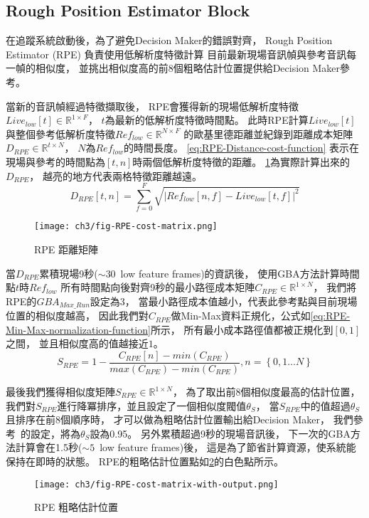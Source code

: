 \documentclass[class=NCU_thesis, crop=false]{standalone}
\begin{document}
\subsection{Rough Position Estimator Block} \label{ch3-subst-RPE}
在追蹤系統啟動後，為了避免Decision Maker的錯誤對齊，
Rough Position Estimator (RPE) 負責使用低解析度特徵計算
目前最新現場音訊幀與參考音訊每一幀的相似度，
並挑出相似度高的前8個粗略估計位置提供給Decision Maker參考。

當新的音訊幀經過特徵擷取後，
RPE會獲得新的現場低解析度特徵$Live_{low}[t] \in \mathbb{R}^{1 \times F}$，
$t$為最新的低解析度特徵時間點。
此時RPE計算$Live_{low}[t]$與整個參考低解析度特徵$Ref_{low} \in \mathbb{R}^{N \times F}$
的歐基里德距離並紀錄到距離成本矩陣$D_{RPE} \in \mathbb{R}^{t \times N}$，
$N$為$Ref_{low}$的時間長度。
\cref{eq:RPE-Distance-cost-function}
表示在現場與參考的時間點為$[t, n]$時兩個低解析度特徵的距離。
\cref{fig:fig-ch3-RPE-cost-matrix}為實際計算出來的$D_{RPE}$，
越亮的地方代表兩格特徵距離越遠。
\begin{equation}
    \label{eq:RPE-Distance-cost-function}
    D_{RPE}[t, n] = \sum_{f = 0}^{F}\sqrt{
    \left\lvert Ref_{low}[n, f]-Live_{low}[t, f]\right\rvert^{2}} 
\end{equation}

\begin{figure}[H]
    \centering
    \texttt{[image: ch3/fig-RPE-cost-matrix.png]}
    \caption{RPE 距離矩陣}
    \label{fig:fig-ch3-RPE-cost-matrix}
\end{figure}

當$D_{RPE}$累積現場9秒($\sim 30$\ low feature frames)的資訊後，
使用GBA方法計算時間點$t$時$Ref_{low}$
所有時間點向後對齊9秒的最小路徑成本矩陣$C_{RPE} \in \mathbb{R}^{1 \times N}$，
我們將RPE的$GBA_{Max\_Run}$設定為3，
當最小路徑成本值越小，代表此參考點與目前現場位置的相似度越高，
因此我們對$C_{RPE}$做Min-Max資料正規化，公式如\cref{eq:RPE-Min-Max-normalization-function}所示，
所有最小成本路徑值都被正規化到$[0,1]$之間，
並且相似度高的值越接近$1$。
\begin{equation}
    \label{eq:RPE-Min-Max-normalization-function}
    S_{RPE} = 1-\frac{C_{RPE}[n]-min(C_{RPE})}{max(C_{RPE})-min(C_{RPE})},
    n = \left\{0, 1 \ldots N\right\} 
\end{equation}

最後我們獲得相似度矩陣$S_{RPE} \in \mathbb{R}^{1 \times N}$，
為了取出前8個相似度最高的估計位置，
我們對$S_{RPE}$進行降冪排序，並且設定了一個相似度閥值$\theta _{S}$，
當$S_{RPE}$中的值超過$\theta _{S}$且排序在前8個順序時，
才可以做為粗略估計位置輸出給Decision Maker，
我們參考~\cite{Arzt2010Towards}的設定，將為$\theta _{S}$設為0.95。
另外累積超過9秒的現場音訊後，
下一次的GBA方法計算會在1.5秒($\sim 5$\ low feature frames)後，
這是為了節省計算資源，使系統能保持在即時的狀態。
RPE的粗略估計位置點如\cref{fig:fig-ch3-RPE-cost-matrix-with-output}的白色點所示。
\begin{figure}[H]
    \centering
    \texttt{[image: ch3/fig-RPE-cost-matrix-with-output.png]}
    \caption{RPE 粗略估計位置}
    \label{fig:fig-ch3-RPE-cost-matrix-with-output}
\end{figure}
\end{document}
